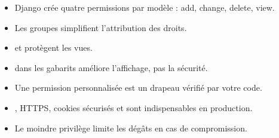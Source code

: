 \begin{retenir}
\begin{itemize}
  \item Django crée quatre permissions par modèle : add, change, delete, view.
  \item Les groupes simplifient l'attribution des droits.
  \item {} et  protègent les
        vues.
  \item {} dans les gabarits améliore l'affichage, pas la sécurité.
  \item Une permission personnalisée est un drapeau vérifié par votre code.
  \item {}, HTTPS, cookies sécurisés et 
        sont indispensables en production.
  \item Le moindre privilège limite les dégâts en cas de compromission.
\end{itemize}
\end{retenir}
